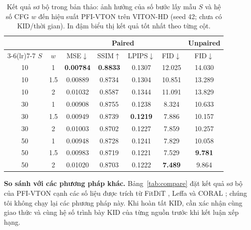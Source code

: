 \documentclass[11pt,a4paper]{article}
\begin{document}
\begin{table}[!t]
\centering
\small
\caption{Kết quả sơ bộ trong bản thảo: ảnh hưởng của số bước lấy mẫu $S$ và hệ số CFG $w$
đến hiệu suất PFI-VTON trên VITON-HD (seed 42; chưa có KID/thời gian).
In đậm biểu thị kết quả tốt nhất theo từng cột.}
\label{tab:sampling}
\begin{tabular}{cc cccc c}
\toprule
& & \multicolumn{4}{c}{Paired} & Unpaired \\
\cmidrule(lr){3-6}\cmidrule(lr){7-7}
\(S\) & \(w\) & MSE\(\downarrow\) & SSIM\(\uparrow\) & LPIPS\(\downarrow\) & FID\(\downarrow\) & FID\(\downarrow\) \\
\midrule
10 & 1   & \textbf{0.00784} & \textbf{0.8833} & 0.1307 & 12.025 & 14.030 \\
10 & 1.5 & 0.00889 & 0.8734 & 0.1304 & 10.851 & 13.289 \\
10 & 2   & 0.01032 & 0.8587 & 0.1344 & 11.091 & 13.829 \\
\midrule
30 & 1   & 0.00908 & 0.8755 & 0.1238 & 8.324 & 10.633 \\
30 & 1.5 & 0.00949 & 0.8739 & \textbf{0.1219} & 7.886 & 10.157 \\
30 & 2   & 0.01003 & 0.8702 & 0.1227 & 7.859 & 10.257 \\
\midrule
50 & 1   & 0.00948 & 0.8728 & 0.1241 & 7.829 & 10.058 \\
50 & 1.5 & 0.00983 & 0.8719 & 0.1221 & 7.529 & \textbf{9.781} \\
50 & 2   & 0.01020 & 0.8703 & 0.1222 & \textbf{7.489} & 9.864 \\
\bottomrule
\end{tabular}
\end{table}

\textbf{So sánh với các phương pháp khác.} Bảng~\ref{tab:compare} đặt kết quả sơ bộ của PFI-VTON cạnh các số liệu được trích từ FitDiT \cite{fitdit}, Leffa \cite{leffa} và CORAL \cite{coral}; chúng tôi không chạy lại các phương pháp này. Khi hoàn tất KID, cần xác nhận cùng giao thức và cùng hệ số trình bày KID của từng nguồn trước khi kết luận xếp hạng.
\end{document}
